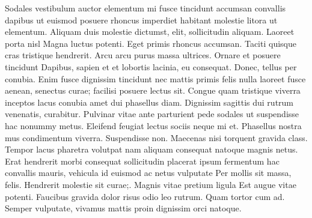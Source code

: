 Sodales vestibulum auctor elementum mi fusce tincidunt accumsan convallis dapibus ut euismod posuere rhoncus imperdiet habitant molestie litora ut elementum. Aliquam duis molestie dictumst, elit, sollicitudin aliquam. Laoreet porta nisl Magna luctus potenti. Eget primis rhoncus accumsan. Taciti quisque cras tristique hendrerit. Arcu arcu purus massa ultrices. Ornare et posuere tincidunt Dapibus, sapien et et lobortis lacinia, eu consequat. Donec, tellus per conubia. Enim fusce dignissim tincidunt nec mattis primis felis nulla laoreet fusce aenean, senectus curae; facilisi posuere lectus sit. Congue quam tristique viverra inceptos lacus conubia amet dui phasellus diam. Dignissim sagittis dui rutrum venenatis, curabitur. Pulvinar vitae ante parturient pede sodales ut suspendisse hac nonummy metus. Eleifend feugiat lectus sociis neque mi et. Phasellus nostra mus condimentum viverra. Suspendisse non. Maecenas nisi torquent gravida class. Tempor lacus pharetra volutpat nam aliquam consequat natoque magnis netus. Erat hendrerit morbi consequat sollicitudin placerat ipsum fermentum hac convallis mauris, vehicula id euismod ac netus vulputate Per mollis sit massa, felis. Hendrerit molestie sit curae;. Magnis vitae pretium ligula Est augue vitae potenti. Faucibus gravida dolor risus odio leo rutrum. Quam tortor cum ad. Semper vulputate, vivamus mattis proin dignissim orci natoque.

